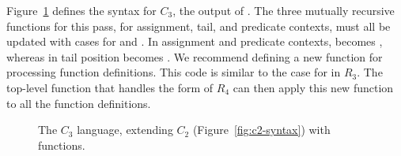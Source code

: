 \documentclass[11pt]{book}
\newcommand{\gray}[1]{{\color{gray} #1}}
\begin{document}
Figure~\ref{fig:c3-syntax} defines the syntax for $C_3$, the output of
. The three mutually recursive functions for
this pass, for assignment, tail, and predicate contexts, must all be
updated with cases for  and . In
assignment and predicate contexts,  becomes ,
whereas in tail position  becomes .  We
recommend defining a new function for processing function definitions.
This code is similar to the case for  in $R_3$.  The
top-level  function that handles the
 form of $R_4$ can then apply this new function to all
the function definitions.

\begin{figure}[tp]
\fbox{
\begin{minipage}{0.96\textwidth}
\[
\begin{array}{lcl}
\Arg &::=& \gray{ \Int \mid \Var \mid \key{\#t} \mid \key{\#f} }
  \\
\itm{cmp} &::= & \gray{  \key{eq?} \mid \key{<} } \\
\Exp &::= & \gray{ \Arg \mid (\key{read}) \mid (\key{-}\;\Arg) \mid (\key{+} \; \Arg\;\Arg)
      \mid (\key{not}\;\Arg) \mid (\itm{cmp}\;\Arg\;\Arg)  } \\
   &\mid& \gray{  (\key{allocate}\,\Int\,\Type)
   \mid (\key{vector-ref}\, \Arg\, \Int)  } \\
   &\mid& \gray{  (\key{vector-set!}\,\Arg\,\Int\,\Arg) \mid (\key{global-value} \,\itm{name}) \mid (\key{void}) } \\
   &\mid& (\key{fun-ref}\,\itm{label}) \mid (\key{call} \,\Arg\,\Arg^{*}) \\
\Stmt &::=& \gray{ \ASSIGN{\Var}{\Exp} \mid \RETURN{\Exp} 
       \mid (\key{collect} \,\itm{int}) }\\
\Tail &::= & \gray{\RETURN{\Exp} \mid (\key{seq}\;\Stmt\;\Tail)} \\
      &\mid& \gray{(\key{goto}\,\itm{label})
       \mid \IF{(\itm{cmp}\, \Arg\,\Arg)}{(\key{goto}\,\itm{label})}{(\key{goto}\,\itm{label})}} \\
      &\mid& (\key{tailcall} \,\Arg\,\Arg^{*}) \\
  \Def &::=& (\key{define}\; (\itm{label} \; [\Var \key{:} \Type]^{*}) \key{:} \Type \; ((\itm{label}\,\key{.}\,\Tail)^{+})) \\
C_3 & ::= & (\key{program}\;\itm{info}\;\Def^{*})
\end{array}
\]
\end{minipage}
}
\caption{The $C_3$ language, extending $C_2$ (Figure~\ref{fig:c2-syntax}) with functions.}
\label{fig:c3-syntax}
\end{figure}
\end{document}
